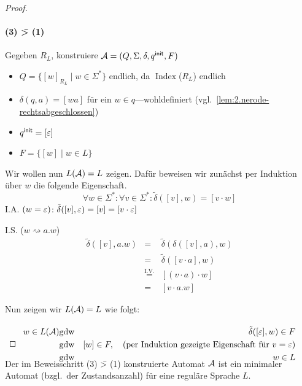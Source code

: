 \begin{proof}
\paragraph{(3) \=> (1)} Gegeben $R_L$, konstruiere $\mathcal{A}=(Q,\Sigma,\delta,q^\mathsf{init},F)$
    \begin{itemize}
    \item $Q = \{ [w]_{R_L} \mid w\in \Sigma^* \}$ \quad endlich, da $\operatorname{Index}$($R_L$) endlich
    \item $\delta(q,a) = [wa]$ \quad für ein $w\in q$---wohldefiniert (vgl.\ \autoref{lem:2.nerode-rechtsabgeschlossen})
    \item $q^\mathsf{init} = [\varepsilon]$
    \item $F = \{ [w] \mid w\in L \}$
    \end{itemize}
    Wir wollen nun $L(\mathcal{A})=L$ zeigen. Dafür beweisen wir zunächst per Induktion über $w$ die folgende Eigenschaft.
        \begin{displaymath}
      \forall w\in\Sigma^* :
                        \forall v\in\Sigma^* : \tilde\delta([v],w) = [v\cdot w]
    \end{displaymath}
    I.A. $(w = \varepsilon)$: $\tilde\delta([v],\varepsilon) = [v]=[v\cdot\varepsilon]$
    
    I.S. ($w\rightsquigarrow a.w$)
      \begin{displaymath}
        \begin{array}{lcl}
        \tilde\delta([v],a.w) &=& \tilde\delta(\delta([v],a),w) \\
                             &=& \tilde\delta([v\cdot a],w) \\
                             &\stackrel{\text{I.V.}}{=}&[(v\cdot a)\cdot w] \\
                             &=& [v\cdot {a.w}]
        \end{array}
      \end{displaymath}

Nun zeigen wir $L(\mathcal{A})=L$ wie folgt:
\begin{eqnarray*}
        w\in L(\A)
        & \text{gdw} & \tilde\delta([\Eps],w)\in F\\
        & \text{gdw} & [w]\in F, \quad \text{(per Induktion gezeigte Eigenschaft für $v=\Eps$)}\\
        & \text{gdw} & w\in L
        \qedherefixeqnarray
\end{eqnarray*}
\end{proof}
%
\setcounter{Korollar}{4}
\begin{Korollar}\label{kor:2.minAutomat}
        Der im Beweisschritt (3) \=> (1) konstruierte Automat $\mathcal{A}$ ist ein minimaler Automat (bzgl.\ der Zustandsanzahl) für eine reguläre Sprache $L$.
\end{Korollar}
